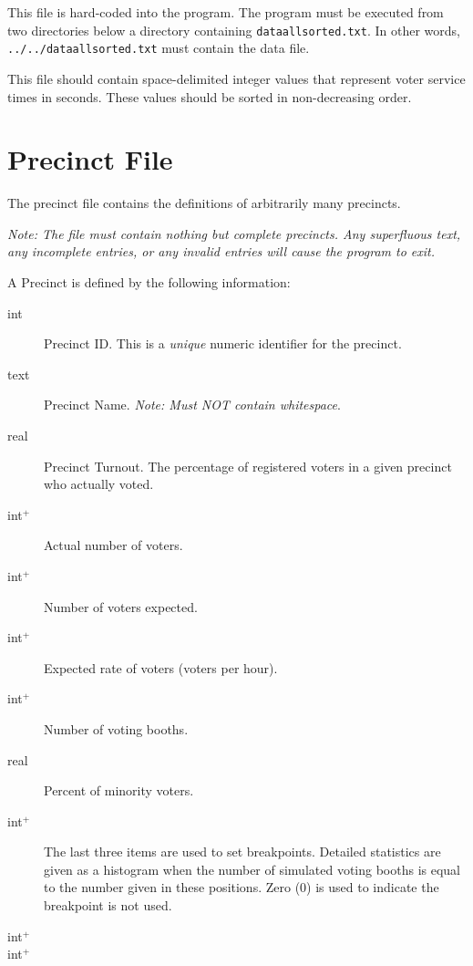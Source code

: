 This file is hard-coded into the program. The program must be executed from two directories below a directory containing \texttt{dataallsorted.txt}. In other words, \texttt{../../dataallsorted.txt} must contain the data file.

This file should contain space-delimited integer values that represent voter service times in seconds. These values should be sorted in non-decreasing order.

\section{Precinct File}

The precinct file contains the definitions of arbitrarily many precincts.

\vspace{0.5cm}

\emph{Note: The file must contain nothing but complete precincts. Any superfluous text, any incomplete entries, or any invalid entries will cause the program to exit.}

\vspace{0.5cm}

A Precinct is defined by the following information:

\begin{description}
\item[int] Precinct ID. This is a \emph{unique} numeric identifier for the precinct.
\item[text] Precinct Name. \emph{Note: Must NOT contain whitespace}.
\item[real] Precinct Turnout. The percentage of registered voters in a given precinct who actually voted.
\item[int$^+$] Actual number of voters.
\item[int$^+$] Number of voters expected.
\item[int$^+$] Expected rate of voters (voters per hour).
\item[int$^+$] Number of voting booths.
\item[real] Percent of minority voters.


\item[int$^+$] The last three items are used to set breakpoints. Detailed statistics are given as a histogram when the number of simulated voting booths is equal to the number given in these positions. Zero (0) is used to indicate the breakpoint is not used.
\item[int$^+$] 
\item[int$^+$] 
\end{description}

